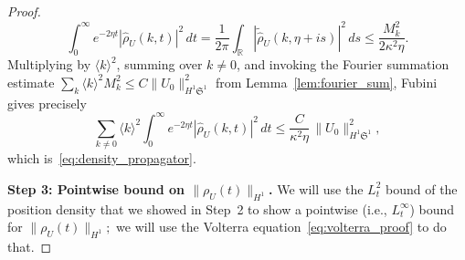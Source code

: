 \documentclass[11pt]{amsart}
\theoremstyle{definition}
\newcommand{\R}{\mathbb{R}}
\newcommand{\Sp}{\mathfrak{S}}
\begin{document}
\begin{proof}
\begin{equation}\label{eq:density_weighted_k}
  \int_0^\infty e^{-2\eta t}
  |\hat\rho_U(k,t)|^2\,dt
  = \frac{1}{2\pi}
  \int_\R|\tilde{\hat\rho}_U(k,\eta+is)|^2\,ds
  \le \frac{M_k^2}{2\kappa^2\eta}.
\end{equation}
Multiplying by $\langle k\rangle^2$, summing over $k\ne 0$, and invoking the Fourier summation estimate $\sum_k\langle k\rangle^2 M_k^2 \le C\|U_0\|_{H^1\Sp^1}^2$ from Lemma~\ref{lem:fourier_sum}, Fubini gives precisely
\begin{equation}\label{eq:density_weighted_final}
  \sum_{k\ne 0}\langle k\rangle^2
  \int_0^\infty e^{-2\eta t}
  |\hat\rho_U(k,t)|^2\,dt
  \le \frac{C}{\kappa^2\eta}\,
  \|U_0\|_{H^1\Sp^1}^2,
\end{equation}
which is~\eqref{eq:density_propagator}.

\medskip

\noindent\textbf{Step 3: Pointwise bound on $\|\rho_U(t)\|_{H^1}$.} We will use the $L^2_t$ bound of the position density that we showed in Step~2 to show a pointwise (i.e., $L^\infty_t$) bound for  $\|\rho_U(t)\|_{H^1};$ we will use the Volterra equation~\eqref{eq:volterra_proof} to do that.


\end{proof}
\end{document}
